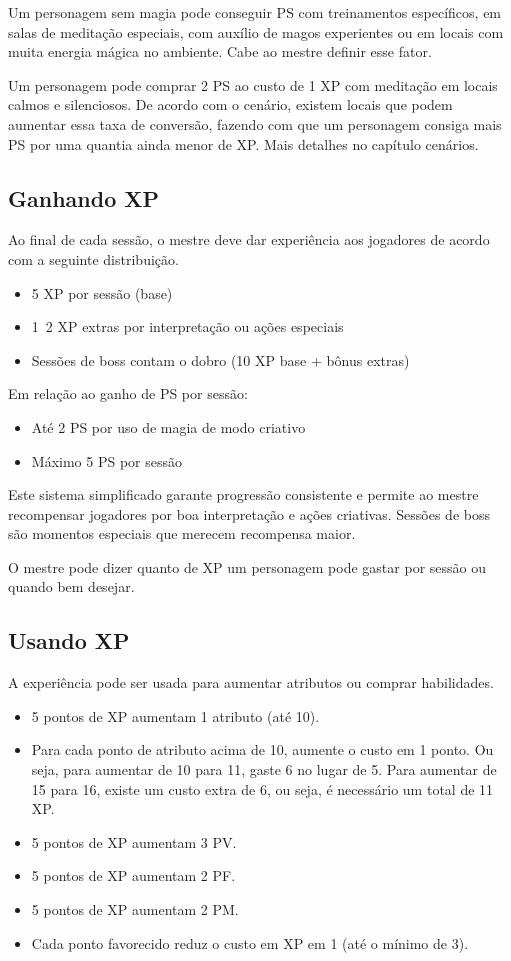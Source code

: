 Um personagem sem magia pode conseguir PS com treinamentos específicos, em salas de meditação especiais, com auxílio de magos experientes ou em locais com muita energia mágica no ambiente. Cabe ao mestre definir esse fator.

Um personagem pode comprar 2 PS ao custo de 1 XP com meditação em locais calmos e silenciosos. De acordo com o cenário, existem locais que podem aumentar essa taxa de conversão, fazendo com que um personagem consiga mais PS por uma quantia ainda menor de XP. Mais detalhes no capítulo cenários.

\subsection{Ganhando XP}
	
Ao final de cada sessão, o mestre deve dar experiência aos jogadores de acordo com a seguinte distribuição. 

\begin{itemize}
\item  5 XP por sessão (base)
\item  1~2 XP extras por interpretação ou ações especiais
\item  Sessões de boss contam o dobro (10 XP base + bônus extras)
\end{itemize}

	Em relação ao ganho de PS por sessão:
\begin{itemize}
\item Até 2 PS por uso de magia de modo criativo
\item Máximo 5 PS por sessão 
\end{itemize}

Este sistema simplificado garante progressão consistente e permite ao mestre recompensar jogadores por boa interpretação e ações criativas. Sessões de boss são momentos especiais que merecem recompensa maior.

O mestre pode dizer quanto de XP um personagem pode gastar por sessão ou quando bem desejar. 

\subsection{Usando XP}

A experiência pode ser usada para aumentar atributos ou comprar habilidades. 

\begin{itemize}
\item 5 pontos de XP aumentam 1 atributo (até 10).
\item Para cada ponto de atributo acima de 10, aumente o custo em 1 ponto. Ou seja, para aumentar de 10 para 11, gaste 6 no lugar de 5. Para aumentar de 15 para 16, existe um custo extra de 6, ou seja, é necessário um total de 11 XP.
\item 5 pontos de XP aumentam 3 PV.
\item 5 pontos de XP aumentam 2 PF.
\item 5 pontos de XP aumentam 2 PM.
\item Cada ponto favorecido reduz o custo em XP em 1 (até o mínimo de 3).
\end{itemize}

